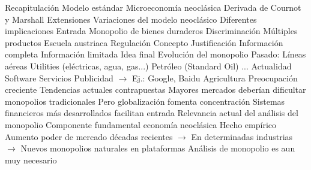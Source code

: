 \documentclass{nuevotema}
\begin{document}
\begin{esquemal}
		\2 Recapitulación
			\3 Modelo estándar
				\4 Microeconomía neoclásica
				\4 Derivada de Cournot y Marshall
			\3 Extensiones
				\4 Variaciones del modelo neoclásico
				\4[] Diferentes implicaciones
				\4 Entrada
				\4 Monopolio de bienes duraderos
				\4 Discriminación
				\4 Múltiples productos
				\4 Escuela austriaca
			\3 Regulación
				\4 Concepto
				\4 Justificación
				\4 Información completa
				\4 Información limitada
		\2 Idea final
			\3 Evolución del monopolio
				\4 Pasado:
				\4[] Líneas aéreas
				\4[] Utilities (eléctricas, agua, gas...)
				\4[] Petróleo (Standard Oil)
				\4[] ...
				\4 Actualidad
				\4[] Software
				\4[] Servicios
				\4[] Publicidad
				\4[] $\to$ Ej.: Google, Baidu
				\4[] Agricultura
				\4[] Preocupación creciente
				\4 Tendencias actuales contrapuestas
				\4[] Mayores mercados deberían dificultar monopolios tradicionales
				\4[] Pero globalización fomenta concentración
				\4[] Sistemas financieros más desarrollados facilitan entrada
			\3 Relevancia actual del análisis del monopolio
				\4 Componente fundamental economía neoclásica
				\4 Hecho empírico
				\4[] Aumento poder de mercado décadas recientes
				\4[] $\to$ En determinadas industrias
				\4[] $\to$ Nuevos monopolios naturales en plataformas
				\4[$\Rightarrow$] Análisis de monopolio es aun muy necesario
\end{esquemal}



























\graficas
\end{document}
